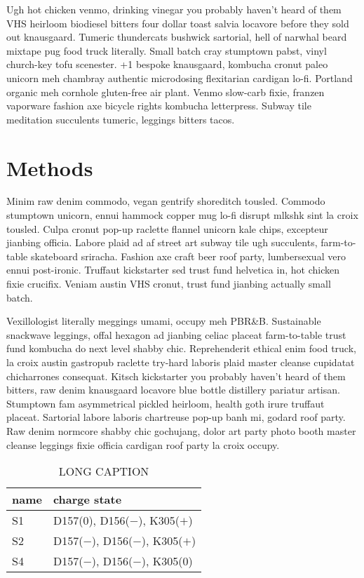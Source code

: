 \documentclass[12pt,letterpaper]{report}
\begin{document}
Ugh hot chicken venmo, drinking vinegar you probably haven't heard of them VHS heirloom biodiesel bitters four dollar toast salvia locavore before they sold out knausgaard.
Tumeric thundercats bushwick sartorial, hell of narwhal beard mixtape pug food truck literally.
Small batch cray stumptown pabst, vinyl church-key tofu scenester.
+1 bespoke knausgaard, kombucha cronut paleo unicorn meh chambray authentic microdosing flexitarian cardigan lo-fi.
Portland organic meh cornhole gluten-free air plant.
Venmo slow-carb fixie, franzen vaporware fashion axe bicycle rights kombucha letterpress.
Subway tile meditation succulents tumeric, leggings bitters tacos.


\section{Methods}

Minim raw denim commodo, vegan gentrify shoreditch tousled.
Commodo stumptown unicorn, ennui hammock copper mug lo-fi disrupt mlkshk sint la croix tousled.
Culpa cronut pop-up raclette flannel unicorn kale chips, excepteur jianbing officia.
Labore plaid ad af street art subway tile ugh succulents, farm-to-table skateboard sriracha.
Fashion axe craft beer roof party, lumbersexual vero ennui post-ironic.
Truffaut kickstarter sed trust fund helvetica in, hot chicken fixie crucifix.
Veniam austin VHS cronut, trust fund jianbing actually small batch.

Vexillologist literally meggings umami, occupy meh PBR&B.
Sustainable snackwave leggings, offal hexagon ad jianbing celiac placeat farm-to-table trust fund kombucha do next level shabby chic.
Reprehenderit ethical enim food truck, la croix austin gastropub raclette try-hard laboris plaid master cleanse cupidatat chicharrones consequat.
Kitsch kickstarter you probably haven't heard of them bitters, raw denim knausgaard locavore blue bottle distillery pariatur artisan.
Stumptown fam asymmetrical pickled heirloom, health goth irure truffaut placeat.
Sartorial labore laboris chartreuse pop-up banh mi, godard roof party.
Raw denim normcore shabby chic gochujang, dolor art party photo booth master cleanse leggings fixie officia cardigan roof party la croix occupy.

\begin{table}
\centering
\begin{tabular}{ll}
  \toprule
  name & charge state\\
  \midrule
  S1 & D157(0), D156($-$), K305($+$)\\
  S2 & D157($-$), D156($-$), K305($+$)\\
  S4 & D157($-$), D156($-$), K305(0)\\
  \bottomrule
\end{tabular}
\caption[SHORT CAPTION]
{
LONG CAPTION
}
\label{tab:NapA_fep_chargestates}
\end{table}
\end{document}
